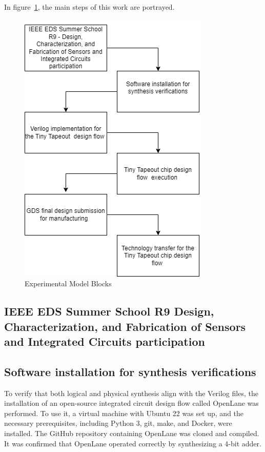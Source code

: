  In figure\ \ref{fig:ExpModelBlocks}, the main steps of this work 
 are portrayed.


 \begin{figure}[H]
    \centering
    \includegraphics[scale=0.6]{Pictures/ExperimentalModel.png}
    \caption{Experimental Model Blocks}
    \label{fig:ExpModelBlocks}
\end{figure}

\subsection{IEEE EDS Summer School R9 \- Design, Characterization, and Fabrication of Sensors and Integrated Circuits participation}


\subsection{Software installation for synthesis verifications}

To verify that both logical and physical synthesis align with the Verilog files, the installation of an  open-source integrated circuit design flow called OpenLane was performed. To use it, a virtual machine with Ubuntu 22 was set up, and the necessary prerequisites, including Python 3, git, make, and Docker, were installed. The GitHub repository containing OpenLane was cloned and compiled. It was confirmed that OpenLane operated correctly by synthesizing a 4-bit adder.
 

